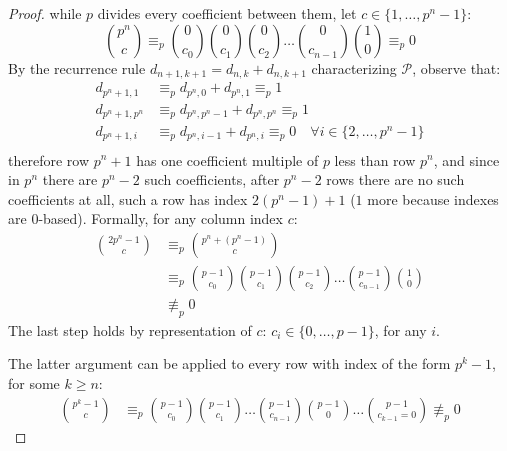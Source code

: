 \documentclass[10pt,a4paper]{article} %
\begin{document}
\begin{proof}
      while $p$ divides every coefficient between them, let
      $c\in\lbrace1,\ldots, p^n-1 \rbrace$:
      \begin{displaymath}
        {{p^n} \choose {c}} \equiv_{p} {{0} \choose {c_0}} {{0} \choose {c_1}}{{0} \choose {c_2}} \ldots 
        {{0} \choose {c_{n-1}}}{{1} \choose {0}} \equiv_{p} 0
      \end{displaymath}
      By the recurrence rule $d_{n+1, k+1} = d_{n, k} + d_{n, k+1}$
      characterizing $\mathcal{P}$, observe that:
      \begin{displaymath}
        \begin{split}
          d_{p^n+1, 1} &\equiv_{p} d_{p^n, 0} + d_{p^n, 1}\equiv_{p} 1 \\
          d_{p^n+1, p^n} &\equiv_{p} d_{p^n, p^n-1} + d_{p^n, p^n}\equiv_{p} 1 \\
          d_{p^n+1, i} &\equiv_{p} d_{p^n, i-1} + d_{p^n, i}\equiv_{p} 0 \quad \forall i \in \lbrace 2, \ldots, p^n -1\rbrace \\
        \end{split}
      \end{displaymath}
      therefore row $p^n + 1$ has one coefficient multiple of $p$ less
      than row $p^n$, and since in $p^n$ there are $p^n-2$ such
      coefficients, after $p^n-2$ rows there are no such coefficients
      at all, such a row has index $2(p^n -1)+1$ ($1$ more because
      indexes are $0$-based). Formally, for any column index $c$:
      \begin{displaymath}
        \begin{split}
          {{2p^n - 1} \choose {c}} &\equiv_{p} {{p^n +(p^n- 1)} \choose {c}} \\
          &\equiv_{p} {{p-1} \choose {c_0}} {{p-1} \choose {c_1}}{{p-1} \choose {c_2}} \ldots 
          {{p-1} \choose {c_{n-1}}}{{1} \choose {0}} \\
          &\not\equiv_{p} 0
        \end{split}
      \end{displaymath}
      The last step holds by representation of $c$:
      $c_i \in \lbrace 0, \ldots, p-1 \rbrace$, for any $i$.

      The latter argument can be applied to every row with index of
      the form $p^k -1$, for some $k\geq n$:
      \begin{displaymath}
        \begin{split}
          {{p^k-1} \choose {c}} &\equiv_{p} {{p-1} \choose {c_0}} {{p-1} \choose {c_1}} \ldots 
          {{p-1} \choose {c_{n-1}}}{{p-1} \choose {0}}\ldots{{p-1} \choose {c_{k-1}=0}} \not\equiv_{p} 0
        \end{split}
      \end{displaymath}


\end{proof}
\end{document}
